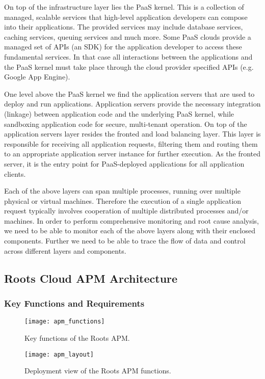 On top of the infrastructure layer lies the PaaS kernel. This is a collection of managed, scalable
services that high-level application developers can compose into their applications. The provided services
may include database services, caching services, queuing services and much more. Some PaaS clouds
provide a managed set of APIs (an SDK) for the application developer to access these fundamental services. 
In that case all interactions between the applications and the PaaS kernel must take place through
the cloud provider specified APIs (e.g. Google App Engine). 

One level above the PaaS kernel we find the application servers that are used to deploy and run
applications. Application servers provide the necessary integration (linkage) between application code and the
underlying PaaS kernel, while sandboxing application code for secure, multi-tenant operation. On top
of the application servers layer resides the fronted and load balancing layer. This layer is responsible
for receiving all application requests, filtering them and routing them to an appropriate application
server instance for further execution. As the fronted server, it is the entry point for PaaS-deployed
applications for all application clients.

Each of the above layers can span multiple processes, running over multiple physical or virtual
machines. Therefore the execution of a single application request typically involves cooperation
of multiple distributed processes and/or machines. In order to perform comprehensive monitoring
and root cause analysis, we need to be able to monitor each of the above layers along with their
enclosed components. Further we need to be able to trace the flow of data and control
across different layers and components.

\subsection{Roots Cloud APM Architecture}
\subsubsection{Key Functions and Requirements}
\begin{figure}
\centering
\texttt{[image: apm\_functions]}
\caption{Key functions of the Roots APM.}
\label{fig:apm_functions}
\end{figure}

\begin{figure}
\centering
\texttt{[image: apm\_layout]}
\caption{Deployment view of the Roots APM functions.}
\label{fig:apm_layout}
\end{figure}

